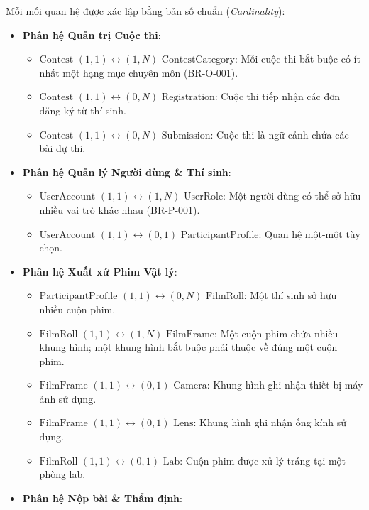 Mỗi mối quan hệ được xác lập bằng bản số chuẩn (\textit{Cardinality}):
\begin{itemize}
    \item \textbf{Phân hệ Quản trị Cuộc thi}:
    \begin{itemize}
        \item $\text{Contest } (1,1) \longleftrightarrow (1,N) \text{ ContestCategory}$: Mỗi cuộc thi bắt buộc có ít nhất một hạng mục chuyên môn (BR-O-001).
        \item $\text{Contest } (1,1) \longleftrightarrow (0,N) \text{ Registration}$: Cuộc thi tiếp nhận các đơn đăng ký từ thí sinh.
        \item $\text{Contest } (1,1) \longleftrightarrow (0,N) \text{ Submission}$: Cuộc thi là ngữ cảnh chứa các bài dự thi.
    \end{itemize}
    \item \textbf{Phân hệ Quản lý Người dùng \& Thí sinh}:
    \begin{itemize}
        \item $\text{UserAccount } (1,1) \longleftrightarrow (1,N) \text{ UserRole}$: Một người dùng có thể sở hữu nhiều vai trò khác nhau (BR-P-001).
        \item $\text{UserAccount } (1,1) \longleftrightarrow (0,1) \text{ ParticipantProfile}$: Quan hệ một-một tùy chọn.
    \end{itemize}
    \item \textbf{Phân hệ Xuất xứ Phim Vật lý}:
    \begin{itemize}
        \item $\text{ParticipantProfile } (1,1) \longleftrightarrow (0,N) \text{ FilmRoll}$: Một thí sinh sở hữu nhiều cuộn phim.
        \item $\text{FilmRoll } (1,1) \longleftrightarrow (1,N) \text{ FilmFrame}$: Một cuộn phim chứa nhiều khung hình; một khung hình bắt buộc phải thuộc về đúng một cuộn phim.
        \item $\text{FilmFrame } (1,1) \longleftrightarrow (0,1) \text{ Camera}$: Khung hình ghi nhận thiết bị máy ảnh sử dụng.
        \item $\text{FilmFrame } (1,1) \longleftrightarrow (0,1) \text{ Lens}$: Khung hình ghi nhận ống kính sử dụng.
        \item $\text{FilmRoll } (1,1) \longleftrightarrow (0,1) \text{ Lab}$: Cuộn phim được xử lý tráng tại một phòng lab.
    \end{itemize}
    \item \textbf{Phân hệ Nộp bài \& Thẩm định}:

\end{itemize}
